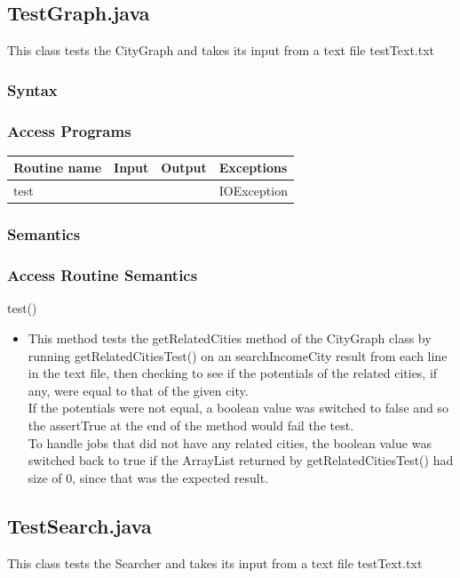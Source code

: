 \documentclass[12pt,fleqn]{article}
\begin{document}

\subsection*{TestGraph.java}\label{testg}
This class tests the CityGraph and takes its input from a text file testText.txt
\subsubsection* {Syntax}

\subsubsection* {Access Programs}
\begin{tabular}{| l | l | l | l |}
\hline
\textbf{Routine name} & \textbf{Input} & \textbf{Output} & \textbf{Exceptions}\\
\hline
test & ~ & ~ & IOException\\
\hline
\end{tabular}

\subsubsection*{Semantics}
\subsubsection*{Access Routine Semantics}
\noindent test()
\begin{itemize}
\item This method tests the getRelatedCities method of the CityGraph class by running getRelatedCitiesTest() on an searchIncomeCity result from each line in the text file, then checking to see if the potentials of the related cities, if any, were equal to that of the given city.
\\If the potentials were not equal, a boolean value was switched to false and so the assertTrue at the end of the method would fail the test.
\\To handle jobs that did not have any related cities, the boolean value was switched back to true if the ArrayList returned by getRelatedCitiesTest() had size of 0, since that was the expected result.
\end{itemize}


\subsection*{TestSearch.java}\label{tests}
This class tests the Searcher and takes its input from a text file testText.txt
\end{document}

